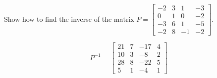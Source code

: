 
\begin{exerciseStatement}


Show how to find the inverse of the matrix \(P= \left[\begin{array}{cccc}
-2 & 3 & 1 & -3 \\
0 & 1 & 0 & -2 \\
-3 & 6 & 1 & -5 \\
-2 & 8 & -1 & -2
\end{array}\right] \).


\end{exerciseStatement}
    
\begin{exerciseAnswer} 
\[P^{-1}= \left[\begin{array}{cccc}
21 & 7 & -17 & 4 \\
10 & 3 & -8 & 2 \\
28 & 8 & -22 & 5 \\
5 & 1 & -4 & 1
\end{array}\right] \]
\end{exerciseAnswer}
    
